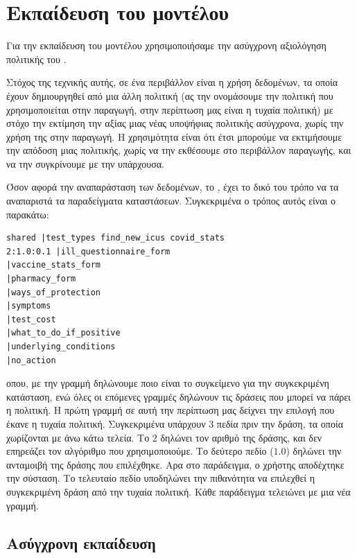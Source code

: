 \section{Εκπαίδευση του μοντέλου}

Για την εκπαίδευση του μοντέλου χρησιμοποιήσαμε την ασύγχρονη αξιολόγηση πολιτικής  του .

Στόχος της τεχνικής αυτής, σε ένα περιβάλλον  είναι η χρήση δεδομένων, τα οποία έχουν δημιουργηθεί από μια άλλη πολιτική (ας την ονομάσουμε την πολιτική που χρησιμοποιείται στην παραγωγή, στην περίπτωση μας είναι η τυχαία πολιτική) με στόχο την εκτίμηση την αξίας μιας νέας υποψήφιας πολιτικής ασύγχρονα, χωρίς την χρήση της στην παραγωγή. Η χρησιμότητα είναι ότι έτσι μπορούμε να εκτιμήσουμε την απόδοση μιας πολιτικής, χωρίς να την εκθέσουμε στο περιβάλλον παραγωγής, και να την συγκρίνουμε με την υπάρχουσα.

Όσον αφορά την αναπαράσταση των δεδομένων, το , έχει το δικό του τρόπο να τα αναπαριστά τα παραδείγματα καταστάσεων. Συγκεκριμένα ο τρόπος αυτός είναι ο παρακάτω:

\begin{otherlanguage}{english}
    \begin{lstlisting}[caption=Μορφή εισόδου \en{Vowpal Wabbit}]
shared |test_types find_new_icus covid_stats
2:1.0:0.1 |ill_questionnaire_form
|vaccine_stats_form
|pharmacy_form
|ways_of_protection
|symptoms
|test_cost
|what_to_do_if_positive
|underlying_conditions
|no_action
    \end{lstlisting}
\end{otherlanguage}

οπου, με την γραμμή  δηλώνουμε ποιο είναι το συγκείμενο για την συγκεκριμένη κατάσταση, ενώ όλες οι επόμενες γραμμές δηλώνουν τις δράσεις που μπορεί να πάρει η πολιτική. Η πρώτη γραμμή σε αυτή την περίπτωση μας δείχνει την επιλογή που έκανε η τυχαία πολιτική. Συγκεκριμένα υπάρχουν 3 πεδία πριν την δράση, τα οποία χωρίζονται με άνω κάτω τελεία. Το $2$ δηλώνει τον αριθμό της δράσης, και δεν επηρεάζει τον αλγόριθμο που χρησιμοποιούμε. Το δεύτερο πεδίο ($1.0$) δηλώνει την ανταμοιβή της δράσης που επιλέχθηκε. Αρα στο παράδειγμα, ο χρήστης αποδέχτηκε την σύσταση. Το τελευταίο πεδίο υποδηλώνει την πιθανότητα να επιλεχθεί η συγκεκριμένη δράση από την τυχαία πολιτική.  Κάθε παράδειγμα τελειώνει με μια νέα γραμμή.

\subsection{Ασύγχρονη εκπαίδευση}

